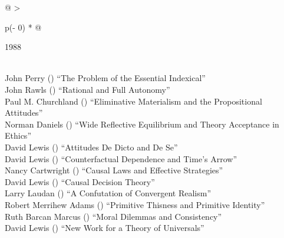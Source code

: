\documentclass[
  10pt,
  letterpaper,
  DIV=11,
  numbers=noendperiod,
  twoside]{scrartcl}
\begin{document}
\begin{longtable}[]{@{}
  >{\raggedright\arraybackslash}p{(\columnwidth - 0\tabcolsep) * }@{}}

\caption{\label{tbl-top-ten-1979}Most cited articles published less than
ten years ago as of 1988.}

\tabularnewline

\toprule\noalign{}
\begin{minipage}[b]{\linewidth}\raggedright
1988
\end{minipage} \\
\midrule\noalign{}
\endhead
\bottomrule\noalign{}
\endlastfoot
John Perry
()
``The Problem of the Essential Indexical'' \\
John Rawls
()
``Rational and Full Autonomy'' \\
Paul M. Churchland
()
``Eliminative Materialism and the Propositional Attitudes'' \\
Norman Daniels
()
``Wide Reflective Equilibrium and Theory Acceptance in Ethics'' \\
David Lewis
()
``Attitudes De Dicto and De Se'' \\
David Lewis
()
``Counterfactual Dependence and Time's Arrow'' \\
Nancy Cartwright
()
``Causal Laws and Effective Strategies'' \\
David Lewis
()
``Causal Decision Theory'' \\
Larry Laudan
()
``A Confutation of Convergent Realism'' \\
Robert Merrihew Adams
()
``Primitive Thisness and Primitive Identity'' \\
Ruth Barcan Marcus
()
``Moral Dilemmas and Consistency'' \\
David Lewis
()
``New Work for a Theory of Universals'' \\

\end{longtable}
\end{document}
